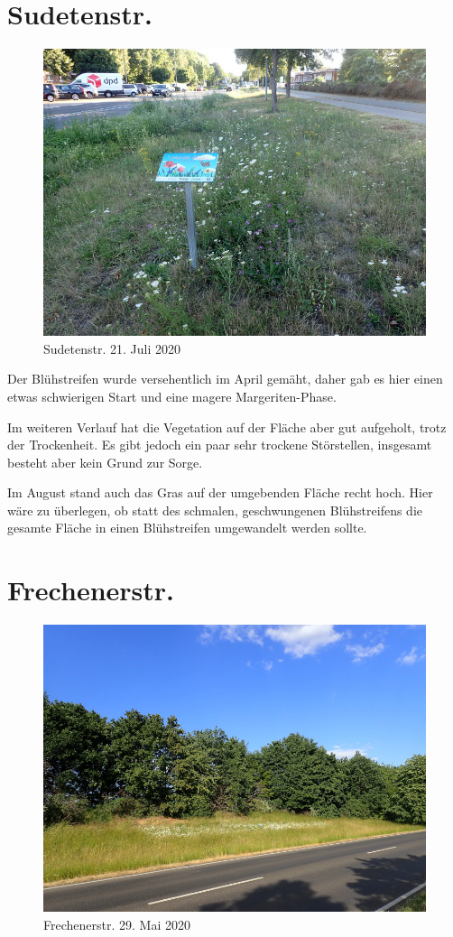 \documentclass[10pt]{article}
\begin{document}
\clearpage
\section{Sudetenstr.}
\begin{figure}[h!]
  \includegraphics[width=\linewidth]{img/asg/juli.jpg}
  \caption{Sudetenstr. 21. Juli 2020}
\end{figure}
Der Blühstreifen wurde versehentlich im April gemäht, daher gab es hier einen etwas schwierigen Start und eine magere Margeriten-Phase.

Im weiteren Verlauf hat die Vegetation auf der Fläche aber gut aufgeholt, trotz der Trockenheit. 
Es gibt jedoch ein paar sehr trockene Störstellen, insgesamt besteht aber kein Grund zur Sorge. 

Im August stand auch das Gras auf der umgebenden Fläche recht hoch. Hier wäre zu überlegen, ob statt des schmalen, geschwungenen Blühstreifens die gesamte Fläche in einen Blühstreifen umgewandelt werden sollte.

\clearpage
\section{Frechenerstr.}
\begin{figure}[h!]
  \includegraphics[width=\linewidth]{img/frechenerstr/mai.jpg}
  \caption{Frechenerstr. 29. Mai 2020}
\end{figure}
\end{document}
